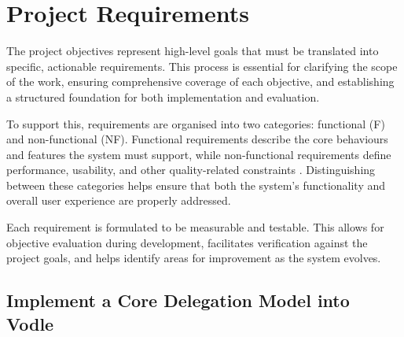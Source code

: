 \section{Project Requirements}
The project objectives represent high-level goals that must be translated into specific, actionable requirements. This process is essential for clarifying the scope of the work, ensuring comprehensive coverage of each objective, and establishing a structured foundation for both implementation and evaluation.

To support this, requirements are organised into two categories: functional (F) and non-functional (NF). Functional requirements describe the core behaviours and features the system must support, while non-functional requirements define performance, usability, and other quality-related constraints \citep{sommervill_2016}. Distinguishing between these categories helps ensure that both the system's functionality and overall user experience are properly addressed.

Each requirement is formulated to be measurable and testable. This allows for objective evaluation during development, facilitates verification against the project goals, and helps identify areas for improvement as the system evolves.

\subsection{Implement a Core Delegation Model into Vodle}
